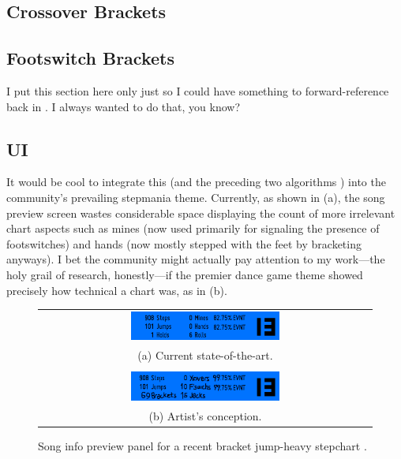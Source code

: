 \documentclass[10pt]{sigplanconf}
\begin{document}
\subsection{Crossover Brackets}
\label{sec:xover-brackers}

\subsection{Footswitch Brackets}
\label{sec:fs-brackers}

I put this section here only just so I could have something to forward-reference back in .
I always wanted to do that, you know?

\subsection{UI}

It would be cool to integrate this (and the preceding two algorithms \cite{turniness,crossoveriness})
into
the community's prevailing stepmania theme.
Currently, as shown in (a),
the song preview screen wastes considerable space displaying the count of more irrelevant chart aspects
such as mines (now used primarily for signaling the presence of footswitches)
and hands (now mostly stepped with the feet by bracketing anyways).
I bet the community might actually pay attention to my work---the holy grail of research, honestly---if
the premier dance game theme showed precisely how technical a chart was, as in (b).

\begin{figure}[t]
	\begin{tabular}{c}
	\includegraphics[width=0.46\textwidth]{song-info.png} \\
		(a) Current state-of-the-art.
		\\
		\\
	\includegraphics[width=0.46\textwidth]{song-info-better.png} \\
		(b) Artist's conception.
	\end{tabular}
	\caption{Song info preview panel for a recent bracket jump-heavy stepchart \cite{divine}.}
	\label{fig:songpreview}
\end{figure}
\end{document}
